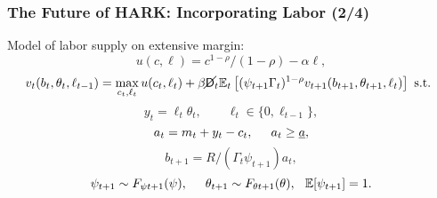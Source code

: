   \begin{frame}
    \frametitle{The Future of HARK: Incorporating Labor (2/4)}
    Model of labor supply on extensive margin:
    \begin{equation*}
      u(c,\ell) = c^{1-\rho}/(1-\rho) - \alpha \ell,
    \end{equation*}
    \begin{equation*}
      v_t(b_t,\theta_t,\ell_{t-1}) = \max_{c_t, \ell_t} u(c_t,\ell_t) + \beta \cancel{\mathsf{D}}_t \mathbb{E}_t \left[(\psi_{t+1} \Gamma_t)^{1-\rho} v_{t+1}(b_{t+1},\theta_{t+1},\ell_t) \right] \text{ s.t. }
    \end{equation*}
    \begin{equation*}
      y_t = \ell_t \theta_t, \qquad \ell_t \in \{0,\ell_{t-1}\},
    \end{equation*}
    \begin{equation*}
      a_t = m_t + y_t - c_t, \hspace{0.5cm} a_t \geq \underline{a},
    \end{equation*}
    \begin{equation*}
      b_{t+1} = R/(\Gamma_t \psi_{t+1}) a_t,
    \end{equation*}
    \begin{equation*}
      \psi_{t+1} \sim F_{\psi t+1}(\psi), \hspace{0.5cm} \theta_{t+1} \sim F_{\theta t+1}(\theta), \hspace{0.25cm} \mathbb{E}[\psi_{t+1}] = 1.
    \end{equation*}
  \end{frame}



